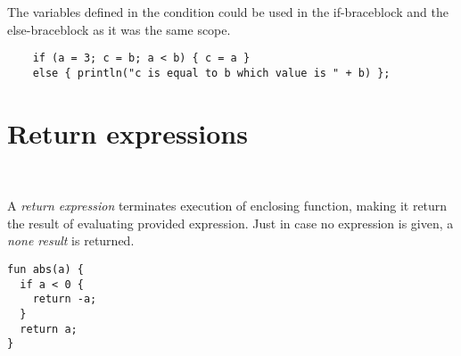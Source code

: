 The variables defined in the condition could be used in the if-braceblock and the else-braceblock as it was the same scope.

\begin{example}[If expression]
  \begin{lstlisting}
    if (a = 3; c = b; a < b) { c = a } 
    else { println("c is equal to b which value is " + b) };
  \end{lstlisting}
\end{example}

\section{Return expressions}

\begin{bnf}
   \eq {} \ 
\end{bnf}

A \emph{return expression} terminates execution of enclosing function, making it return the result of evaluating provided expression. Just in case no expression is given, a \emph{none result} is returned.

\begin{example}
\begin{lstlisting}
fun abs(a) {
  if a < 0 {
    return -a;
  }
  return a;
}
\end{lstlisting}
\end{example}
